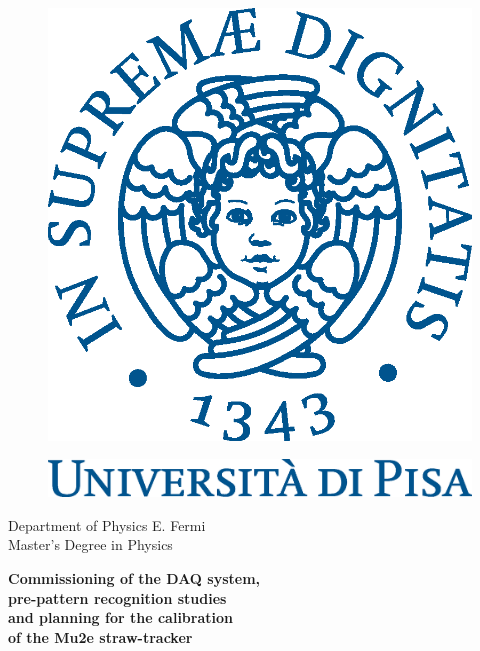 \begin{titlepage}
    \begin{center}
\begin{figure}[!htb]
    \centering
    \includegraphics[keepaspectratio=true,scale=0.4]{figures/eps/cherubinFrontespizio.eps}
\end{figure}
\begin{figure}[!htb]
    \centering
    \includegraphics[keepaspectratio=true,scale=0.45]{figures/eps/logo_pant541.eps}
\end{figure}

    \Large{Department of Physics E. Fermi}
    \vspace{5mm}
    \\ 
    \Large{Master's Degree in Physics}
\end{center}

\vspace{15mm}
\begin{center}
    {\LARGE{\bf Commissioning of the DAQ system,\\ \vspace{3mm} pre-pattern recognition studies\\ \vspace{5mm}and planning for the calibration \\ \vspace{7mm}of the Mu2e straw-tracker}}
\end{center}
\vspace{25mm}


\end{titlepage}

